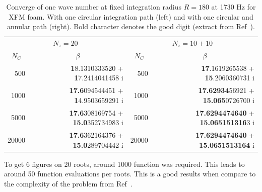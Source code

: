 \documentclass[a4paper,10pt]{article}
\renewcommand{\i}{\mathrm{i}}
\begin{document}
\begin{table}[htbp]
	\centering
		\caption{Converge of one wave number at fixed integration radius $R=180$ at 1730 Hz for XFM foam. With one circular integration path (left) and with one circular and annular path (right). Bold character denotes the good digit (extract from Ref~\cite{Nennig:2010}).}
		\begin{tabular}{rrrr}
		\hline
\multicolumn{2}{c}{$N_{z} = 20$} & \multicolumn{2}{c}{$N_{z} = 10 + 10$}\\
		\cline{1-2} \cline{3-4}
		\multicolumn{1}{c}{$N_C$\rule{0pt}{3.5ex}}     &    \multicolumn{1}{c}{$\beta$}     & \multicolumn{1}{c}{$N_C$}  &       \multicolumn{1}{c}{$\beta$}\\
\rule{0pt}{4ex} 500      & \textbf{1}8.1310333520   + \textbf{1}7.2414041458 $\i$     & 500&    \textbf{17}.1619265538  +  \textbf{15}.2060360731 $\i$\\
		            1000     & \textbf{17.6}094544451   + \textbf{1}4.9503659291 $\i$     & 1000&    \textbf{17.62934}56921   + \textbf{15.065}0726700 $\i$\\
		            5000     & \textbf{17.6}308169754   + \textbf{15.0}352734983 $\i$     & 5000&    \textbf{17.6294474640}   + \textbf{15.065151316}3 $\i$\\
		            20000    & \textbf{17.6}362164376   + \textbf{15.0}289704442 $\i$     & 20000&   \textbf{17.6294474640}   + \textbf{15.0651513164} $\i$ 		\\
		            \hline
		            \end{tabular}
		
	\label{tab:ConvergeWaveNumber}
\end{table}

To get 6 figures on 20 roots, around 1000 function was required. This leads to around 50 function evaluations per roots. This is a good results when compare to the complexity of the problem from Ref~\cite{Nennig:2010}.



\end{document}
